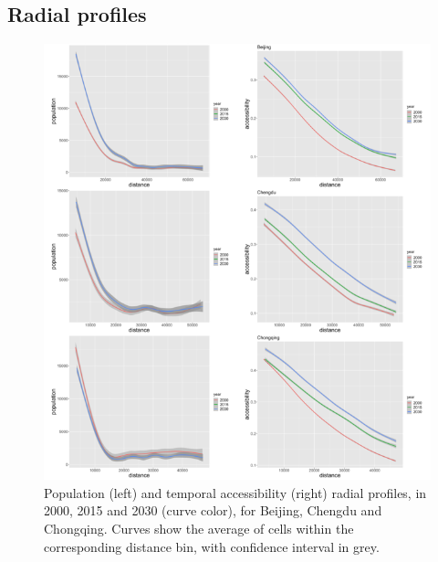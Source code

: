 \documentclass{article}
\begin{document}
\subsection{Radial profiles}



\begin{figure}
	\includegraphics[width=\linewidth]{Fig2a.png}
	\caption{Population (left) and temporal accessibility (right) radial profiles, in 2000, 2015 and 2030 (curve color), for Beijing, Chengdu and Chongqing. Curves show the average of cells within the corresponding distance bin, with confidence interval in grey.\label{fig:fig3}}
\end{figure}
\end{document}
